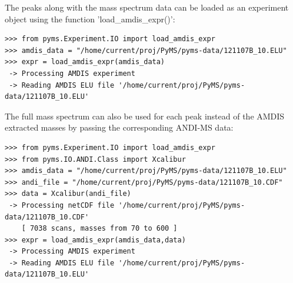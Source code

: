 The peaks along with the mass spectrum data can be loaded as an experiment 
object using the function 'load\_amdis\_expr()':

\begin{verbatim}
>>> from pyms.Experiment.IO import load_amdis_expr
>>> amdis_data = "/home/current/proj/PyMS/pyms-data/121107B_10.ELU"
>>> expr = load_amdis_expr(amdis_data)
 -> Processing AMDIS experiment
 -> Reading AMDIS ELU file '/home/current/proj/PyMS/pyms-data/121107B_10.ELU'
\end{verbatim}

The full mass spectrum can also be used for each peak instead of the AMDIS extracted masses
by passing the corresponding ANDI-MS data:

\begin{verbatim}
>>> from pyms.Experiment.IO import load_amdis_expr
>>> from pyms.IO.ANDI.Class import Xcalibur
>>> amdis_data = "/home/current/proj/PyMS/pyms-data/121107B_10.ELU"
>>> andi_file = "/home/current/proj/PyMS/pyms-data/121107B_10.CDF"
>>> data = Xcalibur(andi_file)
 -> Processing netCDF file '/home/current/proj/PyMS/pyms-data/121107B_10.CDF'
    [ 7038 scans, masses from 70 to 600 ]
>>> expr = load_amdis_expr(amdis_data,data)
 -> Processing AMDIS experiment
 -> Reading AMDIS ELU file '/home/current/proj/PyMS/pyms-data/121107B_10.ELU'
\end{verbatim}

